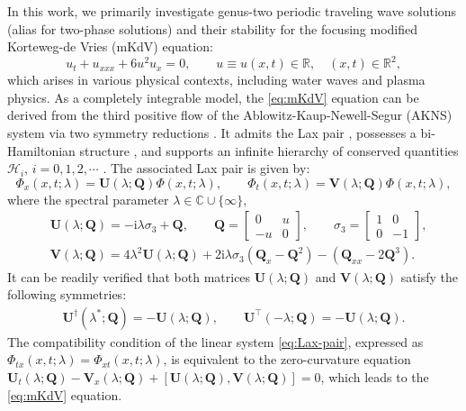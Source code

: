 \documentclass[11pt,reqno]{amsart}
\newcommand{\ii}{\mathrm{i}}
\numberwithin{equation}{section}
\begin{document}
In this work, we primarily investigate genus-two periodic traveling wave solutions (alias for two-phase solutions) and their stability for the focusing modified Korteweg-de Vries (mKdV) equation:
\begin{equation}\label{eq:mKdV}\tag{mKdV}
	u_t+u_{xxx}+6u^2u_{x}=0,\qquad 
	u\equiv u(x,t)\in \mathbb{R}, \quad 
	(x,t)\in \mathbb{R}^2,
\end{equation} 
which arises in various physical contexts, including water waves \cite{AblowitzS-81,Schamel-1973-modified} and plasma physics\cite{AblowitzC-91}.
As a completely integrable model, the \ref{eq:mKdV} equation can be derived from the third positive flow of the Ablowitz-Kaup-Newell-Segur (AKNS) system via two symmetry reductions \cite{AblowitzKNS-1974-inverse}.
It admits the Lax pair \cite{Lax-68-INE}, possesses a bi-Hamiltonian structure \cite{MaF-96-biHamiltonian}, and supports an infinite hierarchy of conserved quantities $\mathcal{H}_i$, $i=0,1,2,\cdots$ \cite{Dickey-2003-soliton,MiuraGK-68-mKdV-conservation}. 
The associated Lax pair is given by:
\begin{equation}\label{eq:Lax-pair} 
	\Phi_x(x,t;\lambda)=\mathbf{U}(\lambda;\mathbf{Q})\Phi(x,t;\lambda), \qquad \Phi_t(x,t;\lambda)=\mathbf{V}(\lambda;\mathbf{Q})\Phi(x,t;\lambda), 
\end{equation}
where the spectral parameter $\lambda\in\mathbb{C}\cup\{\infty\}$,
\begin{equation}\label{eq:Lax-U-V-define}
	\begin{split}
		&\mathbf{U}(\lambda; \mathbf{Q})
		=-\ii \lambda \sigma_3+\mathbf{Q}, \qquad \mathbf{Q}=
		\begin{bmatrix}
			0 &   u \\  -u & 0 
		\end{bmatrix}, \qquad \sigma_3=\begin{bmatrix}
		1 &   0 \\  0 & -1 
		\end{bmatrix},\\
		& \mathbf{V}(\lambda; \mathbf{Q})=4\lambda^2\mathbf{U}(\lambda; \mathbf{Q})
		+2\ii\lambda  \sigma_3(\mathbf{Q}_x-\mathbf{Q}^2)-(\mathbf{Q}_{xx}-2 \mathbf{Q}^3). 
	\end{split}
\end{equation}
It can be readily verified that both matrices $\mathbf{U}(\lambda;\mathbf{Q})$ and $\mathbf{V}(\lambda;\mathbf{Q})$ satisfy the following symmetries:
\begin{equation}\label{eq:symmety-U-V}
	\begin{split}
		\mathbf{U}^{\dagger}(\lambda^*;\mathbf{Q})=-\mathbf{U}(\lambda;\mathbf{Q}),\qquad 
		\mathbf{U}^{\top}(-\lambda;\mathbf{Q})=-\mathbf{U}(\lambda;\mathbf{Q}).
	\end{split}
\end{equation}
The compatibility condition of the linear system \eqref{eq:Lax-pair}, expressed as $\Phi_{tx}(x,t;\lambda)=\Phi_{xt}(x,t;\lambda)$, is equivalent to the zero-curvature equation $\mathbf{U}_t(\lambda;\mathbf{Q})-\mathbf{V}_x(\lambda;\mathbf{Q})+\left[\textbf{U}(\lambda;\mathbf{Q}),\textbf{V}(\lambda;\mathbf{Q})\right]=0$, which leads to the \ref{eq:mKdV} equation.
\end{document}

